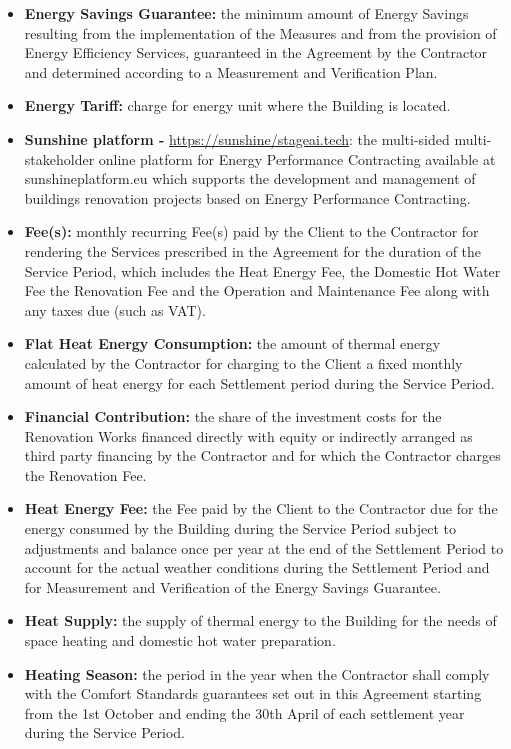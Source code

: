 \begin{multicols}{2}
\begin{itemize}[label={}]
	\item\textbf{Energy Savings Guarantee:} the minimum amount of Energy Savings resulting from the implementation of the Measures and from the provision of Energy Efficiency Services, guaranteed in the Agreement by the Contractor and determined according to a Measurement and Verification Plan.
	\item\textbf{Energy Tariff:} charge for energy unit where the Building is located.
	\item\textbf{Sunshine platform - } \url{https://sunshine/stageai.tech}: the multi-sided multi-stakeholder online platform for Energy Performance Contracting available at sunshineplatform.eu which supports the development and management of buildings renovation projects based on Energy Performance Contracting.
	\item\textbf{Fee(s):} monthly recurring Fee(s) paid by the Client to the Contractor for rendering the Services prescribed in the Agreement for the duration of the Service Period, which includes the Heat Energy Fee, the Domestic Hot Water Fee the Renovation Fee and the Operation and Maintenance Fee along with any taxes due (such as VAT).
	\item\textbf{Flat Heat Energy Consumption:}  the amount of thermal energy calculated by the Contractor for charging to the Client a fixed monthly amount of heat energy for each Settlement period during the Service Period.
	\item\textbf{Financial Contribution:} the share of the investment costs for the Renovation Works financed directly with equity or indirectly arranged as third party financing by the Contractor and for which the Contractor charges the Renovation Fee.
	\item\textbf{Heat Energy Fee:} the Fee paid by the Client to the Contractor due for the energy consumed by the Building during the Service Period subject to adjustments and balance once per year at the end of the Settlement Period to account for the actual weather conditions during the Settlement Period and for Measurement and Verification of the Energy Savings Guarantee.
	\item\textbf{Heat Supply:} the supply of thermal energy to the Building for the needs of space heating and domestic hot water preparation.
	\item\textbf{Heating Season:} the period in the year when the Contractor shall comply with the Comfort Standards guarantees set out in this Agreement starting from the 1st October and ending the 30th April of each settlement year during the Service Period.

\end{itemize}
\end{multicols}
